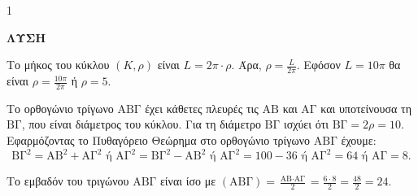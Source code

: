 \begin{ylh}{1}
    \item [Λύση από εικόνα]
\end{ylh}
\textbf{ΛΥΣΗ}

\begin{alist}
    \item[α)] Το μήκος του κύκλου $(K,\rho)$ είναι $L = 2\pi \cdot \rho$. Άρα, $\rho = \frac{L}{2\pi}$.
    Εφόσον $L=10\pi$ θα είναι $\rho = \frac{10\pi}{2\pi}$ ή $\rho=5$.
    \item[β)]
    \begin{rlist}
        \item Το ορθογώνιο τρίγωνο $\text{ΑΒΓ}$ έχει κάθετες πλευρές τις $\text{ΑΒ}$ και $\text{ΑΓ}$ και υποτείνουσα τη $\text{ΒΓ}$, που είναι διάμετρος του κύκλου.
        Για τη διάμετρο $\text{ΒΓ}$ ισχύει ότι $\text{ΒΓ} = 2\rho = 10$.
        Εφαρμόζοντας το Πυθαγόρειο Θεώρημα στο ορθογώνιο τρίγωνο $\text{ΑΒΓ}$ έχουμε:
        \[
        \text{ΒΓ}^2 = \text{ΑΒ}^2 + \text{ΑΓ}^2 \text{ ή } \text{ΑΓ}^2 = \text{ΒΓ}^2 - \text{ΑΒ}^2 \text{ ή } \text{ΑΓ}^2 = 100-36 \text{ ή } \text{ΑΓ}^2 = 64 \text{ ή } \text{ΑΓ}=8.
        \]
        \item Το εμβαδόν του τριγώνου $\text{ΑΒΓ}$ είναι ίσο με $(\text{ΑΒΓ}) = \frac{\text{ΑΒ} \cdot \text{ΑΓ}}{2} = \frac{6 \cdot 8}{2} = \frac{48}{2} = 24$.
    \end{rlist}
\end{alist}
